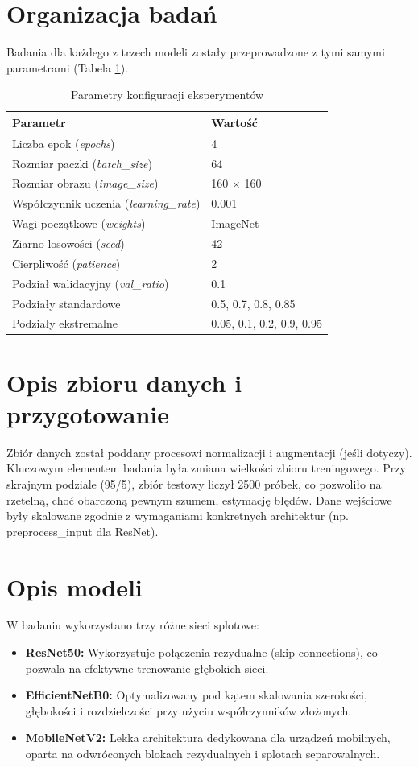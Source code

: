 \documentclass[12pt,a4paper]{article}
\begin{document}
\section{Organizacja badań}
Badania dla każdego z trzech modeli zostały przeprowadzone z tymi samymi parametrami (Tabela \ref{tab:experiment_config}).
\begin{table}[ht]
    \centering
    \caption{Parametry konfiguracji eksperymentów}
    \label{tab:experiment_config}
    \begin{tabular}{ll}
    \toprule
    \textbf{Parametr} & \textbf{Wartość} \\
    \midrule
    Liczba epok (\textit{epochs}) & 4 \\
    Rozmiar paczki (\textit{batch\_size}) & 64 \\
    Rozmiar obrazu (\textit{image\_size}) & 160 $\times$ 160 \\
    Współczynnik uczenia (\textit{learning\_rate}) & 0.001 \\
    Wagi początkowe (\textit{weights}) & ImageNet \\
    Ziarno losowości (\textit{seed}) & 42 \\
    Cierpliwość (\textit{patience}) & 2 \\
    Podział walidacyjny (\textit{val\_ratio}) & 0.1 \\
    \midrule
    Podziały standardowe & 0.5, 0.7, 0.8, 0.85 \\
    Podziały ekstremalne & 0.05, 0.1, 0.2, 0.9, 0.95 \\
    \bottomrule
    \end{tabular}
\end{table}

\section{Opis zbioru danych i przygotowanie}
Zbiór danych został poddany procesowi normalizacji i augmentacji (jeśli dotyczy). Kluczowym elementem badania była zmiana wielkości zbioru treningowego. 
Przy skrajnym podziale (95/5), zbiór testowy liczył 2500 próbek, co pozwoliło na rzetelną, choć obarczoną pewnym szumem, estymację błędów. Dane wejściowe były skalowane zgodnie z wymaganiami konkretnych architektur (np. preprocess\_input dla ResNet).

\section{Opis modeli}
W badaniu wykorzystano trzy różne sieci splotowe:
\begin{itemize}
    \item \textbf{ResNet50:} Wykorzystuje połączenia rezydualne (skip connections), co pozwala na efektywne trenowanie głębokich sieci.
    \item \textbf{EfficientNetB0:} Optymalizowany pod kątem skalowania szerokości, głębokości i rozdzielczości przy użyciu współczynników złożonych.
    \item \textbf{MobileNetV2:} Lekka architektura dedykowana dla urządzeń mobilnych, oparta na odwróconych blokach rezydualnych i splotach separowalnych.
\end{itemize}
\end{document}
